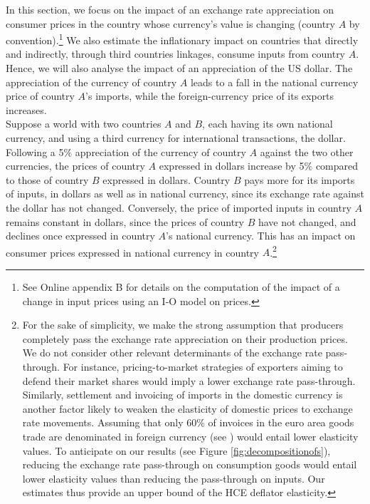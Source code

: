 \documentclass[11pt,a4paper]{paper} %
\begin{document}
In this section, we focus on the impact of an exchange rate appreciation on consumer prices in the country whose currency’s value is changing (country $A$ by convention).\footnote{See Online appendix B for details on the computation of the impact of a change in input prices using an I-O model on prices.}
We also estimate the inflationary impact on countries that directly and indirectly, through third countries linkages, consume inputs from country $A$. Hence, we will also analyse the impact of an appreciation of the US dollar.
The appreciation of the currency of country $A$ leads to a fall in the national currency price of country $A$'s imports, while the foreign-currency price of its exports increases. \\
Suppose a world with two countries $A$ and $B$, each having its own national currency, and using a third currency for international transactions, the dollar.
Following a 5$\%$ appreciation of the currency of country $A$ against the two other currencies, the prices of country $A$ expressed in dollars increase by 5$\%$ compared to those of country $B$ expressed in dollars. 
Country $B$ pays more for its imports of inputs, in dollars as well as in national currency, since its exchange rate against the dollar has not changed. 
Conversely, the price of imported inputs in country $A$ remains constant in dollars, since the prices of country $B$ have not changed, and declines once expressed in country $A$'s national currency. 
This has an impact on consumer prices expressed in national currency in country $A$.\footnote{For the sake of simplicity, we make the strong assumption that producers completely pass the exchange rate appreciation on their production prices.  We do not consider other relevant determinants of the exchange rate pass-through. For instance, pricing-to-market strategies of exporters aiming to defend their market shares would imply a lower exchange rate pass-through.
Similarly, settlement and invoicing of imports in the domestic currency is another factor likely to weaken the elasticity of domestic prices to exchange rate movements. Assuming that only 60\% of invoices in the euro area goods trade are denominated in foreign currency (see \cite{Ortega2020}) would entail lower elasticity values. To anticipate on our results (see Figure \ref{fig:decompositionofs}), reducing the exchange rate pass-through on consumption goods would entail lower elasticity values than reducing the pass-through on inputs. Our estimates thus provide an upper bound of the HCE deflator elasticity.}\\
\end{document}
